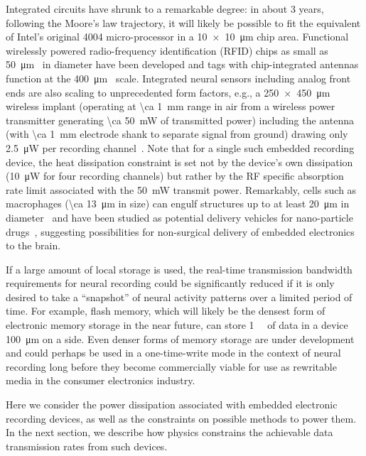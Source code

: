 Integrated circuits have shrunk to a remarkable degree: in about 3 years, following the Moore's law trajectory, it will likely be possible to fit the equivalent of Intel's original 4004 micro-processor in a \SI{10 x 10}{\micro\meter} chip area.
Functional wirelessly powered radio-frequency identification (RFID) chips as small as \SI{50}{\micro\meter}~\cite{Usami2007} in diameter have been developed and tags with chip-integrated antennas function at the \SI{400}{\micro\meter}~\cite{ImpinjMonzaFive} scale.
Integrated neural sensors including analog front ends are also scaling to unprecedented form factors, e.g., a \SI{250 x 450}{\micro\meter} wireless implant (operating at \SI{\ca 1}{\milli\meter} range in air from a wireless power transmitter generating \SI{\ca 50}{\milli\watt} of transmitted power) including the antenna (with \SI{\ca 1}{\milli\meter} electrode shank to separate signal from ground) drawing only \SI{2.5}{\micro\watt} per recording channel~\cite{biederman13}.
Note that for a single such embedded recording device, the heat dissipation constraint is set not by the device's own dissipation (\SI{10}{\micro\watt} for four recording channels) but rather by the RF specific absorption rate limit associated with the \SI{50}{\milli\watt} transmit power.
Remarkably, cells such as macrophages (\SI{\ca 13}{\micro\meter} in size) can engulf structures up to at least \SI{20}{\micro\meter} in diameter~\cite{cannon92} and have been studied as potential delivery vehicles for nano-particle drugs~\cite{Kadiu11}, suggesting possibilities for non-surgical delivery of embedded electronics to the brain.

If a large amount of local storage is used, the real-time transmission bandwidth requirements for neural recording could be significantly reduced if it is only desired to take a ``snapshot'' of neural activity patterns over a limited period of time.
For example, flash memory, which will likely be the densest form of electronic memory storage in the near future, can store \SI{1}{\mega\bit} of data in a device \SI{100}{\micro\meter} on a side.
Even denser forms of memory storage are under development and could perhaps be used in a one-time-write mode in the context of neural recording long before they become commercially viable for use as rewritable media in the consumer electronics industry.

Here we consider the power dissipation associated with embedded electronic recording devices, as well as the constraints on possible methods to power them.
In the next section, we describe how physics constrains the achievable data transmission rates from such devices.

